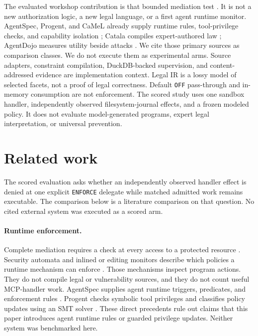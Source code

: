 \documentclass{article}
\begin{document}
The evaluated workshop contribution is that bounded mediation test \citep{vericode2026cfp}. It is not a new authorization logic, a new legal language, or a first agent runtime monitor. AgentSpec, Progent, and CaMeL already supply runtime rules, tool-privilege checks, and capability isolation \citep{wang2025agentspec,shi2025progent,debenedetti2025camel}; Catala compiles expert-authored law \citep{catala}; AgentDojo measures utility beside attacks \citep{debenedetti2024agentdojo}. We cite those primary sources as comparison classes. We do not execute them as experimental arms. Source adapters, constraint compilation, DuckDB-backed supervision, and content-addressed evidence are implementation context. Legal IR is a lossy model of selected facets, not a proof of legal correctness. Default \texttt{OFF} pass-through and in-memory consumption are not enforcement. The scored study uses one sandbox handler, independently observed filesystem-journal effects, and a frozen modeled policy. It does not evaluate model-generated programs, expert legal interpretation, or universal prevention.

\section{Related work}
\label{sec:related}

The scored evaluation asks whether an independently observed handler effect is denied at one explicit \texttt{ENFORCE} delegate while matched admitted work remains executable. The comparison below is a literature comparison on that question. No cited external system was executed as a scored arm.

\paragraph{Runtime enforcement.}
Complete mediation requires a check at every access to a protected resource \citep{saltzer1975protection}. Security automata and inlined or editing monitors describe which policies a runtime mechanism can enforce \citep{schneider2000enforceable,erlingsson2000irm,ligatti2005edit,hamlen2006enforcement}. Those mechanisms inspect program actions. They do not compile legal or vulnerability sources, and they do not count useful MCP-handler work. AgentSpec supplies agent runtime triggers, predicates, and enforcement rules \citep{wang2025agentspec}. Progent checks symbolic tool privileges and classifies policy updates using an SMT solver \citep{shi2025progent}. These direct precedents rule out claims that this paper introduces agent runtime rules or guarded privilege updates. Neither system was benchmarked here.
\end{document}
